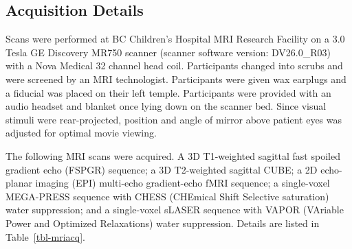 \documentclass[
true
]{sn-jnl}
\begin{document}
\subsection{Acquisition Details}\label{sec-mriacq}

Scans were performed at BC Children's Hospital MRI Research Facility on
a 3.0 Tesla GE Discovery MR750 scanner (scanner software version:
DV26.0\_R03) with a Nova Medical 32 channel head coil. Participants
changed into scrubs and were screened by an MRI technologist.
Participants were given wax earplugs and a fiducial was placed on their
left temple. Participants were provided with an audio headset and
blanket once lying down on the scanner bed. Since visual stimuli were
rear-projected, position and angle of mirror above patient eyes was
adjusted for optimal movie viewing.

The following MRI scans were acquired. A 3D T1-weighted sagittal fast
spoiled gradient echo (FSPGR) sequence; a 3D T2-weighted sagittal CUBE;
a 2D echo-planar imaging (EPI) multi-echo gradient-echo fMRI sequence; a
single-voxel MEGA-PRESS sequence with CHESS (CHEmical Shift Selective
saturation) water suppression; and a single-voxel sLASER sequence with
VAPOR (VAriable Power and Optimized Relaxations) water suppression.
Details are listed in Table~\ref{tbl-mriacq}.
\end{document}
